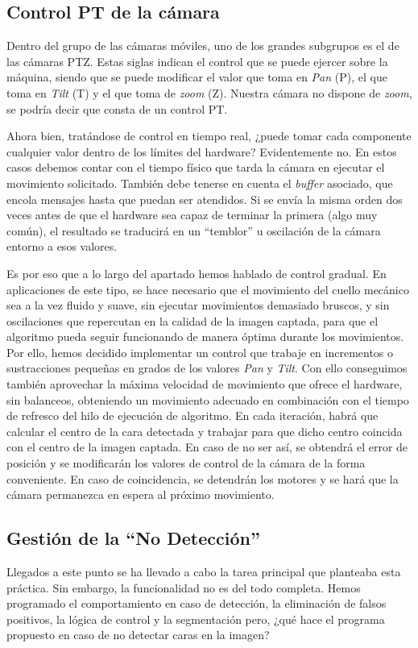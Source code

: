 \subsection{Control PT de la cámara}
Dentro del grupo de las cámaras móviles, uno de los grandes subgrupos es el de las cámaras PTZ. Estas siglas indican el control que se puede ejercer sobre la máquina, siendo que se puede modificar el valor que toma en \textit{Pan} (P), el que toma en \textit{Tilt} (T) y el que toma de \textit{zoom} (Z). Nuestra cámara no dispone de \textit{zoom}, se podría decir que consta de un control PT.

Ahora bien, tratándose de control en tiempo real, ¿puede tomar cada componente cualquier valor dentro de los límites del hardware? Evidentemente no. En estos casos debemos contar con el tiempo físico que tarda la cámara en ejecutar el movimiento solicitado. También debe tenerse en cuenta el \textit{buffer} asociado, que encola mensajes hasta que puedan ser atendidos. Si se envía la misma orden dos veces antes de que el hardware sea capaz de terminar la primera (algo muy común), el resultado se traducirá en un “temblor” u oscilación de la cámara entorno a esos valores.

Es por eso que a lo largo del apartado hemos hablado de control gradual. En aplicaciones de este tipo, se hace necesario que el movimiento del cuello mecánico sea a la vez fluido y suave, sin ejecutar movimientos demasiado bruscos, y sin oscilaciones que repercutan en la calidad de la imagen captada, para que el algoritmo pueda seguir funcionando de manera óptima durante los movimientos.
Por ello, hemos decidido implementar un control que trabaje en incrementos o sustracciones pequeñas en grados de los valores \textit{Pan} y \textit{Tilt}. Con ello conseguimos también aprovechar la máxima velocidad de movimiento que ofrece el hardware, sin balanceos, obteniendo un movimiento adecuado en combinación con el tiempo de refresco del hilo de ejecución de algoritmo. En cada iteración, habrá que calcular el centro de la cara detectada y trabajar para que dicho centro coincida con el centro de la imagen captada. En caso de no ser así, se obtendrá el error de posición y se modificarán los valores de control de la cámara de la forma conveniente. En caso de coincidencia, se detendrán los motores y se hará que la cámara permanezca en espera al próximo movimiento.

\subsection{Gestión de la ``No Detección''}
Llegados a este punto se ha llevado a cabo la tarea principal que planteaba esta práctica. Sin embargo, la funcionalidad no es del todo completa. Hemos programado el comportamiento en caso de detección, la eliminación de falsos positivos, la lógica de control y la segmentación pero, ¿qué hace el programa propuesto en caso de no detectar caras en la imagen?

